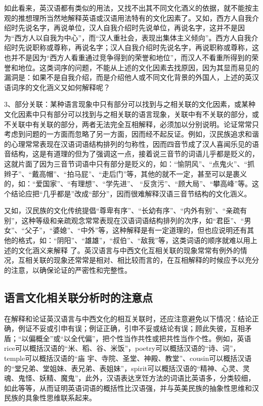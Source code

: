 如此看来，英汉语都有类似的用法，又找不出其不同文化酒义的依据，就不能按主观的推想理所当然地解释英语或汉语用法特有的文化因素了。又如，西方人自我介绍时先说名字，再说单位，汉人自我介绍时先说单位，再说名字，这并不是因为“西方人以自我为中心”，而“汉人重社会，表现出集体主义倾向”。西方人自我介绍时先说职称或尊称，再说名字；汉人自我介绍时先说名字，再说职称或尊称，这也并不是因为“西方人看重通过竞争得到的荣誉和地位”，而汉人不看重所得到的荣誉和地位。这类词序的问题，不能从上述的文化因素去找原因，因为其显而易见的漏洞是：如果不是自我介绍，而是介绍他人或不同文化背景的外国人，上述的英汉语词序的文化涵义又如何解释呢？

3、部分关联：某种语言现象中只有部分可以找到与之相关联的文化因素，或某种文化因素中只有部分可以找到与之相关联的语言现象，关联中有不关联的部分，或不关联中有关联的部分，两者无法完全互相解释，必须加以分别说明。论证常常只考虑到问题的一方面而忽略了另一方面，因而经不起反证。例如，汉民族追求和谐的心理常常表现在汉语词语结构排列的匀称性，因而四音节成了汉人喜闻乐见的语音结构，这是有道理的但为了强调这一点，接着说三音节的词语儿乎都是贬义的，这就片面了因为三音节词语中只有部分是贬义的，如：“愉阴风”、“点鬼火”、“抓辫子”、“戴高帽”、“拍马屁”、“走后门”等，其他的就不一定，甚至可以是裹义的，如：“爱国家”、“有理想”、“学先进”、
“反贪污”、“顾大局”、“攀高峰”等。这个结论应把“几乎都是”改成“部分”，因而很难解释汉语三音节结构的文化涵义。

又如，汉民族的文化传统提倡“尊卑有序”、“长幼有序”、“内外有别”、“亲疏有别”，这种等级和亲疏观念常常表现在汉语词语结构排列的次序，如“君臣”、“男女”、“父子”，“婆媳”、“中外”等，这种解释是有一定道理的，但也应说明还有其他的格式，如：“阴阳”、“雄雄”，“叔伯”、“敌我”等，这类词语的顺序就难以用上述的文化涵义来解释
了。英汉语言与中西文化互相关联的现象常常有例外的情况，互相关联的现象还常常是相对、相比较而言的，在互相解释的时候应予以充分的注意，以确保论证的严密性和完整性。

\subsection{语言文化相关联分析时的注意点}

在解释和论证英汉语言与中西文化的相互关联时，还应注意避免以下情况：结论正确，例证不妥或引申有误；例证正确，引申不妥或结论有误；顾此失彼，互相矛盾；“以偏概全”或“以全代偏”，把个性当作共性或把共性当作个性。例如，英语rice可以概括汉语的“米、稻、谷、米饭”，poetry可以概括汉语的“诗、词”，temple可以概括汉语的“庙
宇、寺院、圣堂、神殿、教堂”、cousin可以概括汉语的“堂兄弟、堂姐妹、表兄弟、表姐妹”，spirit可以概括汉语的“精神、心灵、灵魂、鬼怪、妖精、魔鬼”，此外，汉语表达烹饪方法的词语比英语多，分类较细，如此等等，从而证明英语词语的概括性比汉语强，并与英美民族的抽象性思维和汉民族的具象性思维联系起来。

